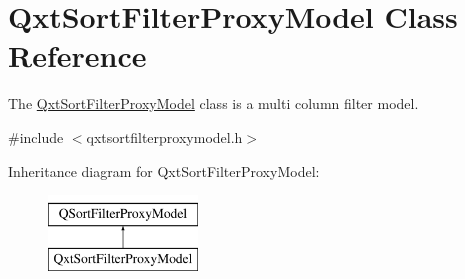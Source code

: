 \hypertarget{class_qxt_sort_filter_proxy_model}{\section{Qxt\-Sort\-Filter\-Proxy\-Model Class Reference}
\label{class_qxt_sort_filter_proxy_model}
}


The \hyperlink{class_qxt_sort_filter_proxy_model}{Qxt\-Sort\-Filter\-Proxy\-Model} class is a multi column filter model.  




{\ttfamily \#include $<$qxtsortfilterproxymodel.\-h$>$}

Inheritance diagram for Qxt\-Sort\-Filter\-Proxy\-Model\-:\begin{figure}[H]
\begin{center}
\leavevmode
\includegraphics[height=2.000000cm]{class_qxt_sort_filter_proxy_model}
\end{center}
\end{figure}
